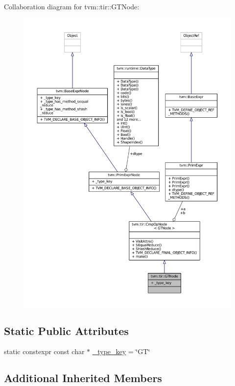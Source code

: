 Collaboration diagram for tvm\+:\+:tir\+:\+:G\+T\+Node\+:
\nopagebreak
\begin{figure}[H]
\begin{center}
\leavevmode
\includegraphics[width=350pt]{classtvm_1_1tir_1_1GTNode__coll__graph}
\end{center}
\end{figure}
\subsection*{Static Public Attributes}
\begin{DoxyCompactItemize}
\item 
static constexpr const char $\ast$ \hyperlink{classtvm_1_1tir_1_1GTNode_a41075d54e53c15536c8ef7bee423b895}{\+\_\+type\+\_\+key} = \char`\"{}GT\char`\"{}
\end{DoxyCompactItemize}
\subsection*{Additional Inherited Members}


